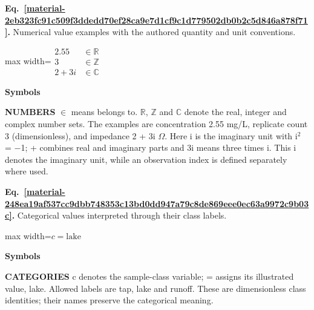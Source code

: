 \documentclass[11pt,a4paper]{article}
\begin{document}
\par\medskip
\begin{samepage}
\label{material-2eb323fc91c509f3ddedd70ef28ca9e7d1cf9c1d779502db0b2c5d846a878f71}
\noindent\textbf{Eq.~\ref*{material-2eb323fc91c509f3ddedd70ef28ca9e7d1cf9c1d779502db0b2c5d846a878f71}.} Numerical value examples with the authored quantity and unit conventions.\par\nopagebreak
\begin{center}\begin{adjustbox}{max width=\linewidth}$\displaystyle \begin{aligned}2.55 &\in \mathbb{R}\\3 &\in \mathbb{Z}\\2+3i &\in \mathbb{C}\end{aligned}$\end{adjustbox}\end{center}

\par\noindent\textbf{Symbols}

\par\noindent\textbf{NUMBERS} \ensuremath{\in} means belongs to. \ensuremath{\mathbb{R}}, \ensuremath{\mathbb{Z}} and \ensuremath{\mathbb{C}} denote the real, integer and complex number sets. The examples are concentration 2.55 mg/L, replicate count 3 (dimensionless), and impedance 2 + 3i \ensuremath{\Omega}. Here i is the imaginary unit with i\ensuremath{{}^2} = \ensuremath{-}1; + combines real and imaginary parts and 3i means three times i. This i denotes the imaginary unit, while an observation index is defined separately where used.

\end{samepage}
\medskip

\par\medskip
\begin{samepage}
\label{material-248ea19af537cc9dbb748353c13bd0dd947a79c8de869eee0ec63a9972c9b03c}
\noindent\textbf{Eq.~\ref*{material-248ea19af537cc9dbb748353c13bd0dd947a79c8de869eee0ec63a9972c9b03c}.} Categorical values interpreted through their class labels.\par\nopagebreak
\begin{center}\begin{adjustbox}{max width=\linewidth}$\displaystyle c=\text{lake}$\end{adjustbox}\end{center}

\par\noindent\textbf{Symbols}

\par\noindent\textbf{CATEGORIES} c denotes the sample-class variable; = assigns its illustrated value, lake. Allowed labels are tap, lake and runoff. These are dimensionless class identities; their names preserve the categorical meaning.

\end{samepage}
\medskip
\end{document}

